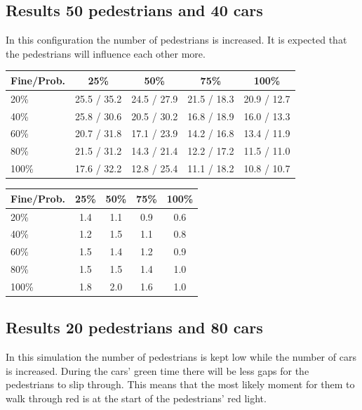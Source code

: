 \documentclass[a4paper]{article}
\begin{document}
\subsection{Results 50 pedestrians and 40 cars}
In this configuration the number of pedestrians is increased. It is expected that the pedestrians will influence each other more.

\begin{table}[H]
\centering
\begin{tabular}{ l | c c c c }
  Fine\slash Prob. & 25\% & 50\% & 75\% & 100\% \\ 
  \hline
  20\%  & 25.5 / 35.2 & 24.5 / 27.9 & 21.5 / 18.3 & 20.9 / 12.7  \\
  40\%  & 25.8 / 30.6 & 20.5 / 30.2 & 16.8 / 18.9 & 16.0 / 13.3  \\
  60\%  & 20.7 / 31.8 & 17.1 / 23.9 & 14.2 / 16.8 & 13.4 / 11.9  \\
  80\%  & 21.5 / 31.2 & 14.3 / 21.4 & 12.2 / 17.2 & 11.5 / 11.0  \\
  100\% & 17.6 / 32.2 & 12.8 / 25.4 & 11.1 / 18.2 & 10.8 / 10.7  \\
\end{tabular}
\end{table}

\begin{table}[H]
\centering
\begin{tabular}{ l | c c c c }
  Fine\slash Prob. & 25\% & 50\% & 75\% & 100\% \\ 
  \hline
  20\%  & 1.4 & 1.1 & 0.9 & 0.6  \\
  40\%  & 1.2 & 1.5 & 1.1 & 0.8  \\
  60\%  & 1.5 & 1.4 & 1.2 & 0.9  \\
  80\%  & 1.5 & 1.5 & 1.4 & 1.0  \\
  100\% & 1.8 & 2.0 & 1.6 & 1.0  \\
\end{tabular}
\end{table}

\clearpage
\subsection{Results 20 pedestrians and 80 cars}
In this simulation the number of pedestrians is kept low while the number of cars is increased. During the cars' green time there will be less gaps for the pedestrians to slip through. This means that the most likely moment for them to walk through red is at the start of the pedestrians' red light.
\end{document}
